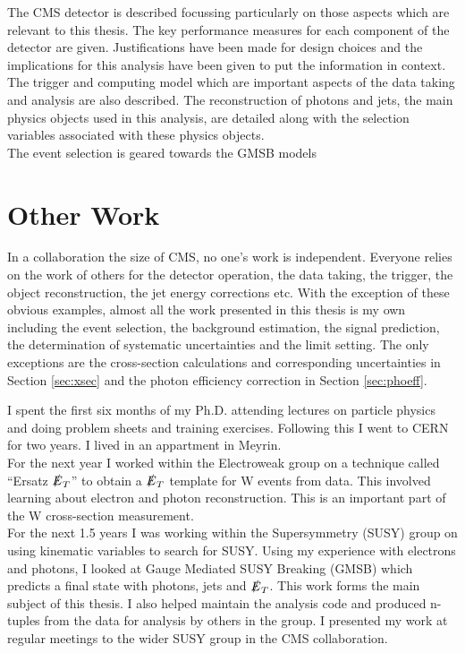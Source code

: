 The CMS detector is described focussing particularly on those aspects which are
relevant to this thesis. The key performance measures for each component of the
detector are given. Justifications have been made for design choices and the 
implications for this analysis have been given to put the information in 
context. The trigger and computing model which are important aspects of the data
taking and analysis are also described. The reconstruction of photons and jets,
the main physics objects used in this analysis, are detailed along with the
selection variables associated with these physics objects. \\

The event selection is geared towards the GMSB models 

\section{Other Work}

In a collaboration the size of CMS, no one's work is independent. Everyone
relies on the work of others for the detector operation, the data taking, the
trigger, the object reconstruction, the jet energy corrections etc. With the
exception of these obvious examples, almost all the work presented in this 
thesis is my own including the event selection, the background estimation, the
signal prediction, the determination of systematic uncertainties and the limit
setting. The only exceptions are the cross-section calculations and 
corresponding uncertainties in Section \ref{sec:xsec} and the photon efficiency
correction in Section \ref{sec:phoeff}.

I spent the first six months of my Ph.D. attending lectures on particle physics 
and doing problem sheets and training exercises. Following this I went to CERN
for two years. I lived in an appartment in Meyrin. \\

For the next year I worked within the Electroweak group on a technique called 
``Ersatz $\slashed{E}_{T}$'' to obtain a $\slashed{E}_{T}$ template for W events from data. This 
involved learning about electron and photon reconstruction. This is an important 
part of the W cross-section measurement. \\

For the next 1.5 years I was working within the Supersymmetry (SUSY) group on 
using kinematic variables to search for SUSY. Using my experience with electrons 
and photons, I looked at Gauge Mediated SUSY Breaking (GMSB) which predicts a 
final state with photons, jets and $\slashed{E}_{T}$. This work forms the main subject of 
this thesis. I also helped maintain the analysis code and produced n-tuples from 
the data for analysis by others in the group. I presented my work at regular 
meetings to the wider SUSY group in the CMS collaboration. \\

